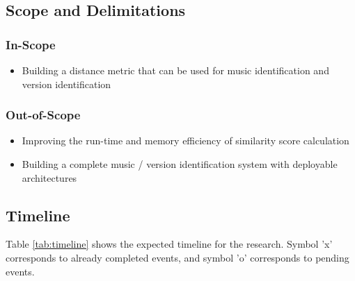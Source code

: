 \documentclass[../main.tex]{subfiles}
\begin{document}
\iffalse
\subsection{Significance of the Project}
\par
Music, being tightly coupled to the flow of time has complex dynamics which it is built upon \cite{complex_dynamics}. Current techniques available for music identification, and version identification do not consider this aspect of music. Therefore more work must be done in this area to explore the usability of this aspect of music to build music and version identification systems. 

\par
Furthermore, the dynamical properties have the potential to reveal patterns inherent to certain composers, genres, cultures, time periods etc. from musical works, which would act as a new basis to conduct more research in the \gls{MIR} domain.
\fi


\subsection{Scope and Delimitations}

\subsubsection{In-Scope}
\begin{itemize}
    \item Building a distance metric that can be used for music identification and version identification
\end{itemize}

\subsubsection{Out-of-Scope}
\begin{itemize}
    \item Improving the run-time and memory efficiency of similarity score calculation
    \item Building a complete music / version identification system with deployable architectures
\end{itemize}


\newpage
\subsection{Timeline}

Table \ref{tab:timeline} shows the expected timeline for the research. Symbol 'x' corresponds to already completed events, and symbol 'o' corresponds to pending events.
\end{document}
